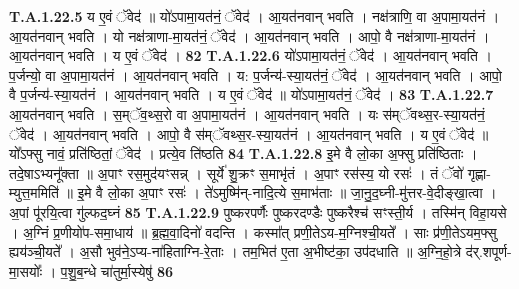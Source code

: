 \documentclass[17pt]{extarticle}
\begin{document}
                  \newline
                                                                  \textbf{ T.A.1.22.5} \newline
                  य ए॒वं ॅवेद॑ ॥ यो॑ऽपामा॒यत॑नं॒ ॅवेद॑ । आ॒यत॑नवान् भवति । नक्ष॑त्राणि॒ वा अ॒पामा॒यत॑नं । आ॒यत॑नवान् भवति । यो नक्ष॑त्राणा-मा॒यत॑नं॒ ॅवेद॑ । आ॒यत॑नवान् भवति । आपो॒ वै नक्ष॑त्राणा-मा॒यत॑नं । आ॒यत॑नवान् भवति ।  य ए॒वं ॅवेद॑ । \textbf{ 82} \newline
                  \newline
                                                                  \textbf{ T.A.1.22.6} \newline
                  यो॑ऽपामा॒यत॑नं॒ ॅवेद॑ । आ॒यत॑नवान् भवति । प॒र्जन्यो॒ वा अ॒पामा॒यत॑नं । आ॒यत॑नवान् भवति ।  य: प॒र्जन्य॑-स्या॒यत॑नं॒ ॅवेद॑ ।  आ॒यत॑नवान् भवति । आपो॒ वै प॒र्जन्य॑-स्या॒यत॑नं ।  आ॒यत॑नवान् भवति । य ए॒वं ॅवेद॑ ॥ यो॑ऽपामा॒यत॑नं॒ ॅवेद॑ । \textbf{ 83} \newline
                  \newline
                                                                  \textbf{ T.A.1.22.7} \newline
                  आ॒यत॑नवान् भवति । स॒म्ॅव॒थ्स॒रो वा अ॒पामा॒यत॑नं । आ॒यत॑नवान् भवति । यः स॑म्ॅवथ्स॒र-स्या॒यत॑नं॒ ॅवेद॑ ।  आ॒यत॑नवान् भवति । आपो॒ वै स॑म्ॅवथ्स॒र-स्या॒यत॑नं । आ॒यत॑नवान् भवति । य ए॒वं ॅवेद॑ ॥  यो᳚ऽफ्सु नावं॒ प्रति॑ष्ठितां॒ ॅवेद॑ । प्रत्ये॒व ति॑ष्ठति \textbf{ 84} \newline
                  \newline
                                                                  \textbf{ T.A.1.22.8} \newline
                  इ॒मे वै लो॒का अ॒फ्सु प्रति॑ष्ठिताः । तदे॒षाऽभ्यनू᳚क्ता ॥  अ॒पाꣳ रस॒मुद॑यꣳसन्न् । सूर्ये॑ शु॒क्रꣳ स॒माभृ॑तं । अ॒पाꣳ रस॑स्य॒ यो रसः॑ । तं ॅवो॑ गृह्णा-म्युत्त॒ममिति॑ ॥ इ॒मे वै लो॒का अ॒पाꣳ रसः॑ । ते॑ऽमुष्मि॑न्-नादि॒त्ये स॒माभ॑ताः ॥  जा॒नु॒द॒घ्नी-मु॑त्तर-वे॒दीङ्खा॒त्वा । अ॒पां पू॑रयि॒त्वा गु॑ल्फद॒घ्नं \textbf{ 85} \newline
                  \newline
                                                                  \textbf{ T.A.1.22.9} \newline
                  पुष्करपर्णैः पुष्करदण्डैः पुष्करैश्च॑ सꣳस्ती॒र्य । तस्मि॑न् विहा॒यसे । अ॒ग्निं प्र॒णीयो॑प-समा॒धाय॑ ॥ ब्र॒ह्म॒वा॒दिनो॑ वदन्ति ।  कस्मा᳚त् प्रणी॒तेऽय-म॒ग्निश्ची॒यते᳚ । साः प्र॑णी॒तेऽयम॒फ्सु ह्यय॑ञ्ची॒यते᳚ ।  अ॒सौ भुव॑ने॒ऽप्य-ना॑हिताग्नि-रे॒ताः ।  तम॒भित॑ ए॒ता अ॒भीष्ट॑का॒ उप॑दधाति ॥  अ॒ग्नि॒हो॒त्रे द॑र्.शपूर्ण-मा॒सयोः᳚ ।  प॒शु॒ब॒न्धे चा॑तुर्मा॒स्येषु॑ \textbf{ 86} \newline
\end{document}
